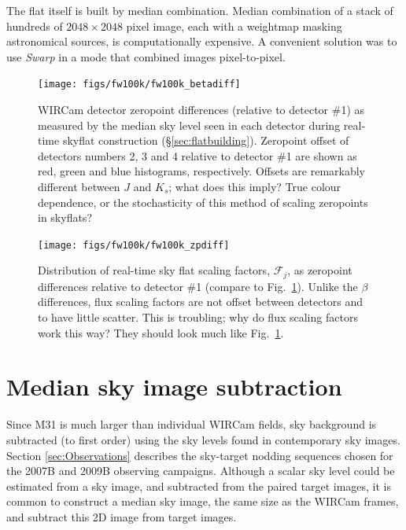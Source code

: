 \documentclass[iop]{emulateapj}
\newcommand{\sw}[1]{\textit{#1}} %
\newcommand{\todo}[1]{\textcolor{RedOrange}{#1}} %
\newcommand{\Fig}[1]{Fig.~\ref{fig:#1}}  %
\newcommand{\Sec}[1]{\S\ref{sec:#1}}  %
\begin{document}
The flat itself is built by median combination. Median combination of a stack of hundreds of $2048\times2048$ pixel image, each with a weightmap masking astronomical sources, is computationally expensive. A convenient solution was to use \sw{Swarp} \citep[an image-mosaicing software package,][]{Bertin:2002} in a mode that combined images pixel-to-pixel.

\begin{figure}[t]
\centering
\texttt{[image: figs/fw100k/fw100k\_betadiff]}
\caption{WIRCam detector zeropoint differences (relative to detector \#1) as measured by the median sky level seen in each detector during real-time skyflat construction (\Sec{flatbuilding}).
Zeropoint offset of detectors numbers 2, 3 and 4 relative to detector \#1 are shown as red, green and blue histograms, respectively.
\todo{Offsets are remarkably different between $J$ and $K_s$; what does this imply? True colour dependence, or the stochasticity of this method of scaling zeropoints in skyflats?}}
\label{fig:fw100k_betadiff}
\end{figure}


\begin{figure}[t]
\centering
\texttt{[image: figs/fw100k/fw100k\_zpdiff]}
\caption{Distribution of real-time sky flat scaling factors, $\mathcal{F}_j$, as zeropoint differences relative to detector \#1 (compare to \Fig{fw100k_betadiff}).
Unlike the $\beta$ differences, flux scaling factors are not offset between detectors and to have little scatter.
\todo{This is troubling; why do flux scaling factors work this way? They should look much like \Fig{fw100k_betadiff}.}}
\label{fig:fw100k_zpdiff}
\end{figure}

\section{Median sky image subtraction}
\label{sec:mediansky}

Since M31 is much larger than individual WIRCam fields, sky background is subtracted (to first order) using the sky levels found in contemporary sky images.
Section \ref{sec:Observations} describes the sky-target nodding sequences chosen for the 2007B and 2009B observing campaigns. 
Although a scalar sky level could be estimated from a sky image, and subtracted from the paired target images, it is common to construct a median sky image, the same size as the WIRCam frames, and subtract this 2D image from target images.
\end{document}
